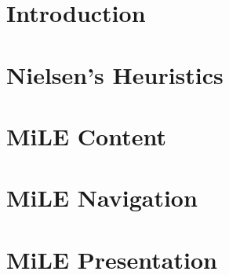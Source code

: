 \section{Introduction}

\section{Nielsen's Heuristics}

\section{MiLE Content}

\section{MiLE Navigation}

\section{MiLE Presentation}
